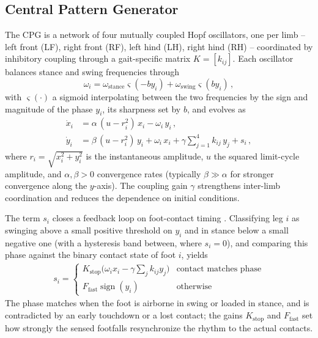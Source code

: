 \documentclass[letterpaper, 10 pt, conference]{ieeeconf}  %
\begin{document}
\subsection{Central Pattern Generator}
\label{sec:cpg}

The CPG is a network of four mutually coupled Hopf oscillators, one per limb -- left front (LF), right front (RF), left hind (LH), right hind (RH) -- coordinated by inhibitory coupling through a gait-specific matrix $K = [k_{ij}]$.
Each oscillator balances stance and swing frequencies through
\begin{equation}
	\omega_i = \omega_{\mathrm{stance}} \varsigma(-b y_i)  + \omega_{\mathrm{swing}} \varsigma(b y_i) \, , \label{eq:omega_i}
\end{equation}
with $\varsigma(\cdot)$ a sigmoid interpolating between the two frequencies by the sign and magnitude of the phase $y_i$, its sharpness set by $b$, and evolves as
\begin{align}
  \dot{x}_i &= \alpha\,(u - r_i^2)\,x_i - \omega_i\,y_i \,, \\
  \dot{y}_i &= \beta\,(u - r_i^2)\,y_i + \omega_i\,x_i
               + \gamma \sum_{j=1}^4 k_{ij}\,y_j + s_i \,, \label{eq:ydot}
\end{align}
where $r_i = \sqrt{x_i^2 + y_i^2}$ is the instantaneous amplitude, $u$ the squared limit-cycle amplitude, and $\alpha, \beta > 0$ convergence rates (typically $\beta \gg \alpha$ for stronger convergence along the $y$-axis).
The coupling gain $\gamma$ strengthens inter-limb coordination and reduces the dependence on initial conditions.

%
The term $s_i$ closes a feedback loop on foot-contact timing \cite{righetti2008pattern}.
Classifying leg $i$ as swinging above a small positive threshold on $y_i$ and in stance below a small negative one (with a hysteresis band between, where $s_i = 0$), and comparing this phase against the binary contact state of foot $i$, yields
\begin{align}
  s_i =
  \begin{cases}
    K_{\text{stop}} \big( \omega_i x_i - \gamma \sum_{j} k_{ij} y_j \big) & \text{contact matches phase} \\
    F_{\text{fast}} \operatorname{sign}(y_i) & \text{otherwise}
  \end{cases}
  \label{eq:feedback}
\end{align}
The phase matches when the foot is airborne in swing or loaded in stance, and is contradicted by an early touchdown or a lost contact; the gains $K_{\text{stop}}$ and $F_{\text{fast}}$ set how strongly the sensed footfalls resynchronize the rhythm to the actual contacts.
\end{document}
